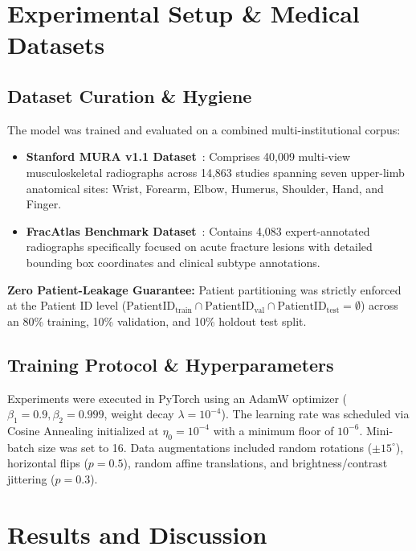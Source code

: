 \documentclass[journal]{IEEEtran}
\begin{document}
\section{Experimental Setup \& Medical Datasets}

\subsection{Dataset Curation \& Hygiene}
The model was trained and evaluated on a combined multi-institutional corpus:
\begin{itemize}
    \item \textbf{Stanford MURA v1.1 Dataset}~\cite{rajpurkar2017mura}: Comprises 40,009 multi-view musculoskeletal radiographs across 14,863 studies spanning seven upper-limb anatomical sites: Wrist, Forearm, Elbow, Humerus, Shoulder, Hand, and Finger.
    \item \textbf{FracAtlas Benchmark Dataset}~\cite{fracatlas2023}: Contains 4,083 expert-annotated radiographs specifically focused on acute fracture lesions with detailed bounding box coordinates and clinical subtype annotations.
\end{itemize}

\textbf{Zero Patient-Leakage Guarantee:} Patient partitioning was strictly enforced at the Patient ID level ($\text{PatientID}_{\text{train}} \cap \text{PatientID}_{\text{val}} \cap \text{PatientID}_{\text{test}} = \emptyset$) across an 80\% training, 10\% validation, and 10\% holdout test split.

\subsection{Training Protocol \& Hyperparameters}
Experiments were executed in PyTorch using an AdamW optimizer ($\beta_1 = 0.9, \beta_2 = 0.999$, weight decay $\lambda = 10^{-4}$). The learning rate was scheduled via Cosine Annealing initialized at $\eta_0 = 10^{-4}$ with a minimum floor of $10^{-6}$. Mini-batch size was set to 16. Data augmentations included random rotations ($\pm 15^\circ$), horizontal flips ($p=0.5$), random affine translations, and brightness/contrast jittering ($p=0.3$).

\section{Results and Discussion}
\end{document}
